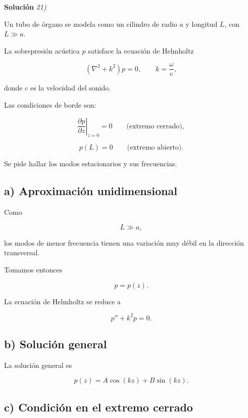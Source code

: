 \documentclass[11pt,spanish]{article}
\begin{document}
\vspace{0.5cm}
{\bf Soluci\'on }{\em 21)}
\vspace{0.5cm}

Un tubo de órgano se modela como un cilindro de radio \(a\) y longitud \(L\),
con \(L\gg a\).

La sobrepresión acústica \(p\) satisface la ecuación de Helmholtz

\[
(\nabla^2+k^2)p=0,
\qquad
k=\frac{\omega}{c},
\]

donde \(c\) es la velocidad del sonido.

Las condiciones de borde son:

\[
\left.\frac{\partial p}{\partial z}\right|_{z=0}=0
\qquad
\text{(extremo cerrado)},
\]

\[
p(L)=0
\qquad
\text{(extremo abierto)}.
\]

Se pide hallar los modos estacionarios y sus frecuencias.


\subsection*{a) Aproximación unidimensional}

Como

\[
L\gg a,
\]

los modos de menor frecuencia tienen una variación muy débil en la dirección
transversal.

Tomamos entonces

\[
p=p(z).
\]

La ecuación de Helmholtz se reduce a

\[
p''+k^2p=0.
\]


\subsection*{b) Solución general}

La solución general es

\[
p(z)
=
A\cos(kz)
+
B\sin(kz).
\]


\subsection*{c) Condición en el extremo cerrado}
\end{document}
